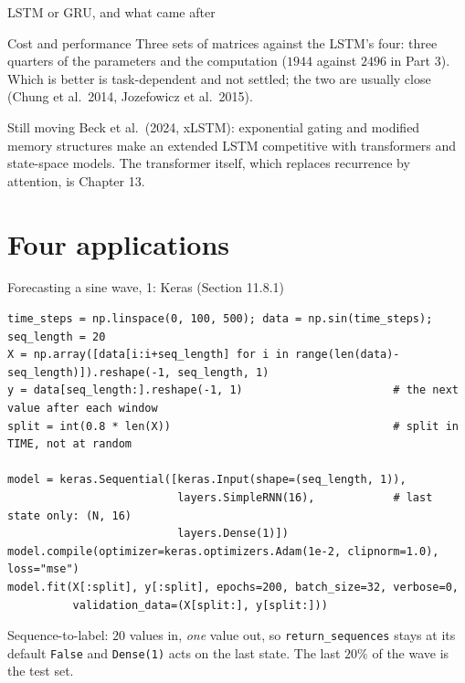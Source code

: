 \documentclass[10pt,aspectratio=169]{beamer}
\begin{document}
\begin{frame}{LSTM or GRU, and what came after}
\begin{block}{Cost and performance}
Three sets of matrices against the LSTM's four: three quarters of the
parameters and the computation ($1944$ against $2496$ in Part 3).  Which is
better is task-dependent and not settled; the two are usually close (Chung
et al.\ 2014, Jozefowicz et al.\ 2015).
\end{block}
\begin{block}{Still moving}
Beck et al.\ (2024, xLSTM): exponential gating and modified memory
structures make an extended LSTM competitive with transformers and
state-space models.  The transformer itself, which replaces recurrence by
attention, is Chapter 13.
\end{block}
\end{frame}

\section{Four applications}
\begin{frame}[fragile]{Forecasting a sine wave, 1: Keras (Section 11.8.1)}
\begin{lstlisting}
time_steps = np.linspace(0, 100, 500); data = np.sin(time_steps); seq_length = 20
X = np.array([data[i:i+seq_length] for i in range(len(data)-seq_length)]).reshape(-1, seq_length, 1)
y = data[seq_length:].reshape(-1, 1)                       # the next value after each window
split = int(0.8 * len(X))                                  # split in TIME, not at random

model = keras.Sequential([keras.Input(shape=(seq_length, 1)),
                          layers.SimpleRNN(16),            # last state only: (N, 16)
                          layers.Dense(1)])
model.compile(optimizer=keras.optimizers.Adam(1e-2, clipnorm=1.0), loss="mse")
model.fit(X[:split], y[:split], epochs=200, batch_size=32, verbose=0,
          validation_data=(X[split:], y[split:]))
\end{lstlisting}
\small
Sequence-to-label: $20$ values in, \emph{one} value out, so
\texttt{return\_sequences} stays at its default \texttt{False} and
\texttt{Dense(1)} acts on the last state.  The last $20\%$ of the wave is
the test set.
\end{frame}
\end{document}
